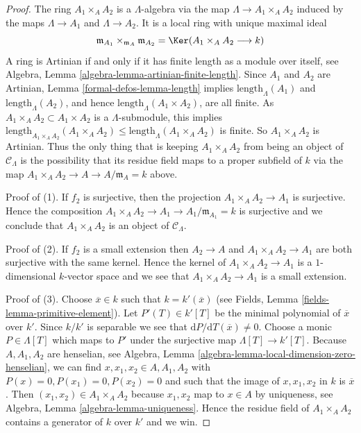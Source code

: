 \begin{proof}
The ring $A_1 \times_A A_2$ is a $\Lambda$-algebra via  the map
$\Lambda \to A_1 \times_A A_2$ induced by the maps
$\Lambda \to A_1$ and $\Lambda \to A_2$. It is a local ring with unique
maximal ideal
$$
\mathfrak m_{A_1} \times_{\mathfrak m_A} \mathfrak m_{A_2} =
\Ker(A_1 \times_A A_2 \longrightarrow k)
$$
A ring is Artinian if and only if it has finite length as a module
over itself, see
Algebra, Lemma \ref{algebra-lemma-artinian-finite-length}.
Since $A_1$ and $A_2$ are Artinian, Lemma \ref{formal-defos-lemma-length} implies
$\text{length}_\Lambda(A_1)$ and $\text{length}_\Lambda(A_2)$,
and hence $\text{length}_\Lambda(A_1 \times A_2)$, are all finite.  As
$A_1 \times_A A_2 \subset A_1 \times A_2$ is a $\Lambda$-submodule, this
implies
$\text{length}_{A_1 \times_A A_2}(A_1 \times_A A_2) \leq
\text{length}_\Lambda(A_1 \times_A A_2)$ is finite. So $A_1
\times_A A_2$ is Artinian. Thus the only thing that is keeping
$A_1 \times_A A_2$ from being an object of $\mathcal{C}_\Lambda$ is
the possibility that its residue field maps to a proper subfield of $k$
via the map $A_1 \times_A A_2 \to A \to A/\mathfrak m_A = k$ above.

\medskip\noindent
Proof of (1). If $f_2$ is surjective, then the projection
$A_1 \times_A A_2 \to A_1$ is surjective. Hence the composition
$A_1 \times_A A_2 \to A_1 \to A_1/\mathfrak m_{A_1} = k$ is surjective
and we conclude that $A_1 \times_A A_2$ is an object of $\mathcal{C}_\Lambda$.

\medskip\noindent
Proof of (2). If $f_2$ is a small extension then $A_2 \to A$ and
$A_1 \times_A A_2  \to A_1$ are both surjective with the same kernel.
Hence the kernel of $A_1 \times_A A_2  \to A_1$ is a $1$-dimensional
$k$-vector space and we see that $A_1 \times_A A_2  \to A_1$ is a small
extension.

\medskip\noindent
Proof of (3). Choose $\overline{x} \in k$ such that
$k = k'(\overline{x})$ (see
Fields, Lemma \ref{fields-lemma-primitive-element}).
Let $P'(T) \in k'[T]$ be the minimal polynomial of $\overline{x}$ over $k'$.
Since $k/k'$ is separable we see that
$\text{d}P/\text{d}T(\overline{x}) \not = 0$.
Choose a monic $P \in \Lambda[T]$ which maps to $P'$ under the surjective map
$\Lambda[T] \to k'[T]$. Because $A, A_1, A_2$ are henselian, see
Algebra, Lemma \ref{algebra-lemma-local-dimension-zero-henselian},
we can find $x, x_1, x_2 \in A, A_1, A_2$ with $P(x) = 0, P(x_1) = 0,
P(x_2) = 0$ and such that the image of $x, x_1, x_2$ in $k$ is $\overline{x}$.
Then $(x_1, x_2) \in A_1 \times_A A_2$ because $x_1, x_2$
map to $x \in A$ by uniqueness, see
Algebra, Lemma \ref{algebra-lemma-uniqueness}.
Hence the residue field of
$A_1 \times_A A_2$ contains a generator of $k$ over $k'$ and we win.
\end{proof}


